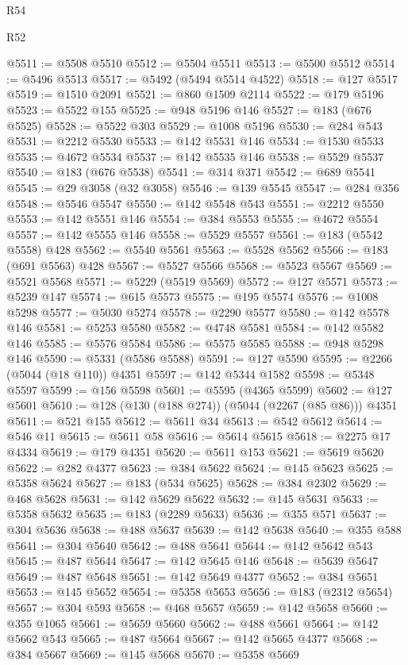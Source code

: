 \begin{lexlean}{R54}
\begin{lexlean}{R52}
\begin{coremodule}
{{{{{{{{{{{{{{{{{{{{{{{{{{{{{{{{{{{{{{{{{{{{{{{{{{{{{{{{{{{{{{{{{{{{{{{{{{{{{{{{{{{{{{{{{{{{{{{{{{{{{{{{{{{{{{{{{{{{{{{{{{{{{{{{{{{{{{{{{{{{{{{{{{{{{{{{{{{{{{{{{{{{{{{{{{{{{{{{{{{{{{{{{{{{{{{{{{{{{{@5511 := @5508 @5510
@5512 := @5504 @5511
@5513 := @5500 @5512
@5514 := @5496 @5513
@5517 := @5492 (@5494 @5514 @4522)
@5518 := @127 @5517
@5519 := @1510 @2091
@5521 := @860 @1509 @2114
@5522 := @179 @5196
@5523 := @5522 @155
@5525 := @948 @5196 @146
@5527 := @183 (@676 @5525)
@5528 := @5522 @303
@5529 := @1008 @5196
@5530 := @284 @543
@5531 := @2212 @5530
@5533 := @142 @5531 @146
@5534 := @1530 @5533
@5535 := @4672 @5534
@5537 := @142 @5535 @146
@5538 := @5529 @5537
@5540 := @183 (@676 @5538)
@5541 := @314 @371
@5542 := @689 @5541
@5545 := @29 @3058 (@32 @3058)
@5546 := @139 @5545
@5547 := @284 @356
@5548 := @5546 @5547
@5550 := @142 @5548 @543
@5551 := @2212 @5550
@5553 := @142 @5551 @146
@5554 := @384 @5553
@5555 := @4672 @5554
@5557 := @142 @5555 @146
@5558 := @5529 @5557
@5561 := @183 (@5542 @5558) @428
@5562 := @5540 @5561
@5563 := @5528 @5562
@5566 := @183 (@691 @5563) @428
@5567 := @5527 @5566
@5568 := @5523 @5567
@5569 := @5521 @5568
@5571 := @5229 (@5519 @5569)
@5572 := @127 @5571
@5573 := @5239 @147
@5574 := @615 @5573
@5575 := @195 @5574
@5576 := @1008 @5298
@5577 := @5030 @5274
@5578 := @2290 @5577
@5580 := @142 @5578 @146
@5581 := @5253 @5580
@5582 := @4748 @5581
@5584 := @142 @5582 @146
@5585 := @5576 @5584
@5586 := @5575 @5585
@5588 := @948 @5298 @146
@5590 := @5331 (@5586 @5588)
@5591 := @127 @5590
@5595 := @2266 (@5044 (@18 @110)) @4351
@5597 := @142 @5344 @1582
@5598 := @5348 @5597
@5599 := @156 @5598
@5601 := @5595 (@4365 @5599)
@5602 := @127 @5601
@5610 := @128 (@130 (@188 @274)) (@5044 (@2267 (@85 @86))) @4351
@5611 := @521 @155
@5612 := @5611 @34
@5613 := @542 @5612
@5614 := @546 @11
@5615 := @5611 @58
@5616 := @5614 @5615
@5618 := @2275 @17 @4334
@5619 := @179 @4351
@5620 := @5611 @153
@5621 := @5619 @5620
@5622 := @282 @4377
@5623 := @384 @5622
@5624 := @145 @5623
@5625 := @5358 @5624
@5627 := @183 (@534 @5625)
@5628 := @384 @2302
@5629 := @468 @5628
@5631 := @142 @5629 @5622
@5632 := @145 @5631
@5633 := @5358 @5632
@5635 := @183 (@2289 @5633)
@5636 := @355 @571
@5637 := @304 @5636
@5638 := @488 @5637
@5639 := @142 @5638
@5640 := @355 @588
@5641 := @304 @5640
@5642 := @488 @5641
@5644 := @142 @5642 @543
@5645 := @487 @5644
@5647 := @142 @5645 @146
@5648 := @5639 @5647
@5649 := @487 @5648
@5651 := @142 @5649 @4377
@5652 := @384 @5651
@5653 := @145 @5652
@5654 := @5358 @5653
@5656 := @183 (@2312 @5654)
@5657 := @304 @593
@5658 := @468 @5657
@5659 := @142 @5658
@5660 := @355 @1065
@5661 := @5659 @5660
@5662 := @488 @5661
@5664 := @142 @5662 @543
@5665 := @487 @5664
@5667 := @142 @5665 @4377
@5668 := @384 @5667
@5669 := @145 @5668
@5670 := @5358 @5669
}}}}}}}}}}}}}}}}}}}}}}}}}}}}}}}}}}}}}}}}}}}}}}}}}}}}}}}}}}}}}}}}}}}}}}}}}}}}}}}}}}}}}}}}}}}}}}}}}}}}}}}}}}}}}}}}}}}}}}}}}}}}}}}}}}}}}}}}}}}}}}}}}}}}}}}}}}}}}}}}}}}}}}}}}}}}}}}}}}}}}}}}}}}}}}}}}}}}}}
\end{coremodule}
\end{lexlean}
\end{lexlean}

